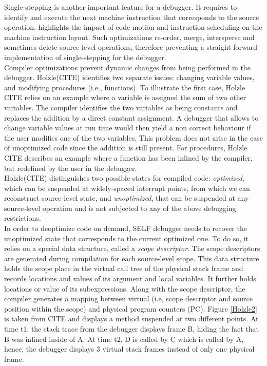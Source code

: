 Single-stepping is another important feature for a debugger. 
It requires to identify and execute the next machine instruction that corresponds to the source operation.
 highlights the impact of code motion and instruction scheduling on the machine instruction layout. 
Such optimizations re-order, merge, intersperse and sometimes delete source-level operations, therefore preventing a straight forward implementation of single-stepping for the debugger.\\

Compiler optimizations prevent dynamic changes from being performed in the debugger.
Holzle(CITE) identifies two separate issues: changing variable values, and modifying procedures (i.e., functions).
To illustrate the first case, Holzle CITE relies on an example where a variable is assigned the sum of two other variables.
The compiler identifies the two variables as being constants and replaces the addition by a direct constant assignment.
A debugger that allows to change variable values at run time would then yield a non correct behaviour if the user modifies one of the two variables. 
This problem does not arise in the case of unoptimized code since the addition is still present. 
For procedures, Holzle CITE describes an example where a function has been inlined by the compiler, but redefined by the user in the debugger.\\

Holzle(CITE) distinguishes two possible states for compiled code: \textit{optimized}, which can be suspended at widely-spaced interrupt points, from which we can reconstruct source-level state, and \textit{unoptimized}, that can be suspended at any source-level operation and is not subjected to any of the above debugging restrictions.\\

In order to deoptimize code on demand, SELF debugger needs to recover the unoptimized state that corresponds to the current optimized one. 
To do so, it relies on a special data structure, called a \textit{scope descriptor}. 
The scope descriptors are generated during compilation for each source-level scope. 
This data structure holds the scope place in the virtual call tree of the physical stack frame and records locations and values of its argument and local variables. 
It further holds locations or value of its subexpressions. Along with the scope descriptor, the compiler generates a mapping between virtual (i.e, scope descriptor and source position within the scope) and physical program counters (PC).
Figure \ref{Holzle2} is taken from CITE and displays a method suspended at two different points. 
At time t1, the stack trace from the debugger displays frame B, hiding the fact that B was inlined inside of A.
At time t2, D is called by C which is called by A, hence, the debugger displays 3 virtual stack frames instead of only one physical frame.\\

